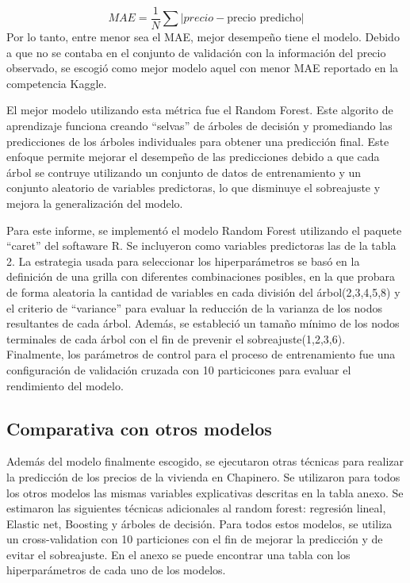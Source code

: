 \documentclass[
  11pt,
  letterpaper,
]{article}
\begin{document}
\[MAE=\frac{1}{N} \sum |precio - \text{precio predicho}|\]
Por lo tanto, entre menor sea el MAE, mejor desempeño tiene el modelo. Debido a que no se contaba en el conjunto de validación con la información del precio observado, se escogió como mejor modelo aquel con menor MAE reportado en la competencia Kaggle.

El mejor modelo utilizando esta métrica fue el Random Forest. Este algorito de aprendizaje funciona creando ``selvas'' de árboles de decisión y promediando las predicciones de los árboles individuales para obtener una predicción final. Este enfoque permite mejorar el desempeño de las predicciones debido a que cada árbol se contruye utilizando un conjunto de datos de entrenamiento y un conjunto aleatorio de variables predictoras, lo que disminuye el sobreajuste y mejora la generalización del modelo.

Para este informe, se implementó el modelo Random Forest utilizando el paquete ``caret'' del softaware R. Se incluyeron como variables predictoras las de la tabla 2. La estrategia usada para seleccionar los hiperparámetros se basó en la definición de una grilla con diferentes combinaciones posibles, en la que probara de forma aleatoria la cantidad de variables en cada división del árbol(2,3,4,5,8) y el criterio de ``variance'' para evaluar la reducción de la varianza de los nodos resultantes de cada árbol. Además, se estableció un tamaño mínimo de los nodos terminales de cada árbol con el fin de prevenir el sobreajuste(1,2,3,6). Finalmente, los parámetros de control para el proceso de entrenamiento fue una configuración de validación cruzada con 10 particicones para evaluar el rendimiento del modelo.

\hypertarget{comparativa-con-otros-modelos}{%
\subsection{Comparativa con otros modelos}\label{comparativa-con-otros-modelos}}

Además del modelo finalmente escogido, se ejecutaron otras técnicas para realizar la predicción de los precios de la vivienda en Chapinero. Se utilizaron para todos los otros modelos las mismas variables explicativas descritas en la tabla anexo. Se estimaron las siguientes técnicas adicionales al random forest: regresión lineal, Elastic net, Boosting y árboles de decisión. Para todos estos modelos, se utiliza un cross-validation con 10 particiones con el fin de mejorar la predicción y de evitar el sobreajuste. En el anexo se puede encontrar una tabla con los hiperparámetros de cada uno de los modelos.
\end{document}

